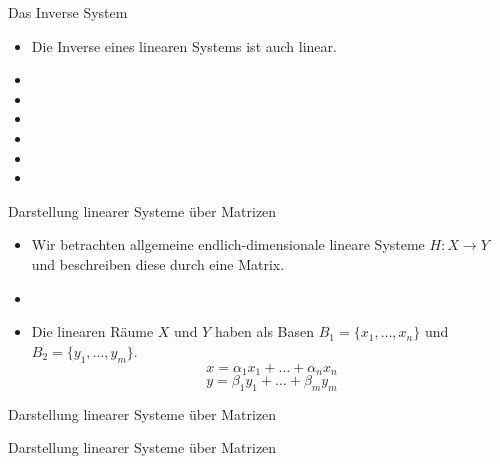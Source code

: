 \documentclass[14pt, aspectratio=169, handout]{beamer}
\begin{document}
\begin{frame}{Das Inverse System}
    \begin{itemize}
        \item Die Inverse eines linearen Systems ist auch linear.
        \item[] 
        \item[]
        \item[] 
        \item[]
        \item[] 
        \item[]
    \end{itemize}
\end{frame}

\begin{frame}{Darstellung linearer Systeme über Matrizen}
    \begin{itemize}
        \item Wir betrachten allgemeine endlich-dimensionale lineare Systeme $H:X \to Y$ und beschreiben diese durch eine Matrix.
        \item[] 
        \item Die linearen Räume $X$ und $Y$ haben als Basen $B_1 = \{x_1, \dots, x_n\}$ und $B_2 = \{ y_1, \dots, y_m \}$.
        $$x = \alpha_1 x_1 + \dots + \alpha_n x_n$$
        $$y = \beta_1 y_1 + \dots + \beta_m y_m$$
    \end{itemize}
\end{frame}

\begin{frame}{Darstellung linearer Systeme über Matrizen}
    
\end{frame}

\begin{frame}{Darstellung linearer Systeme über Matrizen}
    
\end{frame}
\end{document}
